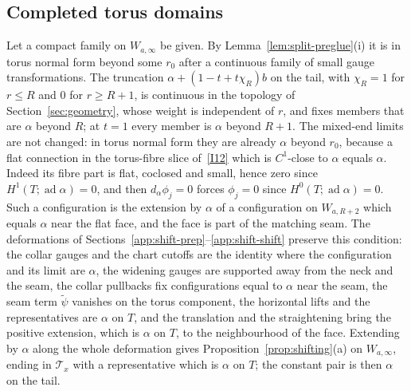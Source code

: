 \documentclass[11pt]{amsart}
\theoremstyle{definition}
\theoremstyle{remark}
\theoremstyle{plain}
\numberwithin{equation}{section}
\newcommand{\ad}{\operatorname{ad}}
\begin{document}
\subsection{Completed torus domains}\label{app:shift-completed}
Let a compact family on $W_{a,\infty}$ be given. By
Lemma~\ref{lem:split-preglue}(i) it is in torus normal form beyond some
$r_0$ after a continuous family of small gauge transformations. The
truncation $\alpha+(1-t+t\chi_{R})b$ on the tail, with $\chi_R=1$ for
$r\le R$ and $0$ for $r\ge R+1$, is continuous in the topology of
Section~\ref{sec:geometry}, whose weight is independent of $r$, and fixes
members that are $\alpha$ beyond $R$; at $t=1$ every member is $\alpha$ beyond
$R+1$. The mixed-end limits are not changed: in torus normal form they are
already $\alpha$ beyond $r_0$, because a flat connection in the
torus-fibre slice of~\ref{I12} which is $C^1$-close to $\alpha$
equals $\alpha$. Indeed its fibre part is flat, coclosed and small, hence
zero since $H^1(T;\ad\alpha)=0$, and then $d_\alpha\phi_j=0$ forces
$\phi_j=0$ since $H^0(T;\ad\alpha)=0$. Such a configuration is the extension by $\alpha$ of a configuration on
$W_{a,R+2}$ which equals $\alpha$ near the flat face, and the face is part of
the matching seam. The deformations of
Sections~\ref{app:shift-prep}--\ref{app:shift-shift} preserve this condition:
the collar gauges and the chart cutoffs are the identity where the
configuration and its limit are $\alpha$, the widening gauges are supported
away from the neck and the seam, the collar pullbacks fix
configurations equal to $\alpha$ near the seam, the seam term $\widetilde\psi$
vanishes on the torus component, the horizontal lifts and the representatives
are $\alpha$ on $T$, and the translation and the straightening bring the
positive extension, which is $\alpha$ on $T$, to the neighbourhood of the face.
Extending by $\alpha$ along the whole deformation gives
Proposition~\ref{prop:shifting}(a) on $W_{a,\infty}$, ending in $\mathcal T_x$
with a representative which is $\alpha$ on $T$; the constant pair is then $\alpha$
on the tail.
\end{document}
